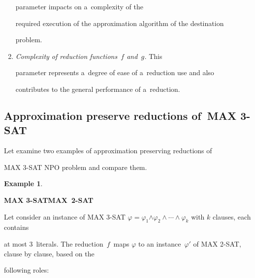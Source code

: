 \begin{multicols}{2}
\begin{enumerate}[1.]
parameter impacts on a~complexity of the


required execution of the approximation algorithm of the destination


problem.


\item {\it Complexity of reduction functions~$f$ and~$g$.} This


parameter represents a~degree of ease of a~reduction use and also


contributes to the general performance of a~reduction.


\end{enumerate}





\subsection{Approximation preserve reductions of~MAX 3-SAT}





\noindent


Let examine two examples of approximation preserving reductions of


{MAX 3-SAT} NPO problem and compare them.





\smallskip





\noindent


\textbf{Example 1}.\


\textbf{MAX 3-SAT\;MAX~2-SAT}








\smallskip





\noindent


Let consider an instance of MAX 3-SAT $\varphi = \varphi_1$\linebreak $


\wedge \varphi_2 \wedge\cdots\wedge \varphi_k$ with $k$ clauses, each contains


at most 3~literals. The reduction~$f$~maps $\varphi$ to an instance~$\varphi'$ of MAX 2-SAT, clause by clause, based on the


following roles:



\end{multicols}
